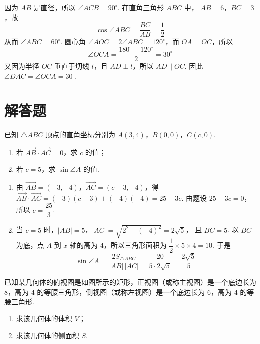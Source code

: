 \begin{solution}
因为 \(AB\) 是直径，所以 \(\angle ACB=90^\circ\). 在直角三角形 \(ABC\) 中，
\(AB=6\)，\(BC=3\)，故
\[
\cos\angle ABC=\frac{BC}{AB}=\frac{1}{2}
\]
从而 \(\angle ABC=60^\circ\). 圆心角
\(\angle AOC=2\angle ABC=120^\circ\)，而 \(OA=OC\)，所以
\[
\angle OCA=\frac{180^\circ-120^\circ}{2}=30^\circ
\]
又因为半径 \(OC\) 垂直于切线 \(l\)，且 \(AD\perp l\)，所以 \(AD\parallel OC\). 因此
\(\angle DAC=\angle OCA=30^\circ\).
\end{solution}

\section{解答题}

\begin{problem}
已知 \(\triangle ABC\) 顶点的直角坐标分别为 \(A(3,4)\)，\(B(0,0)\)，\(C(c,0)\).

\begin{enumerate}
\item 若 \(\overrightarrow{AB} \cdot \overrightarrow{AC} = 0\)，求 \(c\) 的值；
\item 若 \(c = 5\)，求 \(\sin \angle A\) 的值.
\end{enumerate}
\end{problem}

\begin{solution}
\begin{enumerate}
\item 由 \(\overrightarrow{AB}=(-3,-4)\)，\(\overrightarrow{AC}=(c-3,-4)\)，得
\(\overrightarrow{AB}\cdot\overrightarrow{AC}=(-3)(c-3)+(-4)(-4)=25-3c\).
由题设 \(25-3c=0\)，所以 \(c=\dfrac{25}{3}\).
\item 当 \(c=5\) 时，\(|AB|=5\)，\(|AC|=\sqrt{2^{2}+(-4)^{2}}=2\sqrt{5}\)，
且 \(BC=5\). 以 \(BC\) 为底，点 \(A\) 到 \(x\) 轴的高为 \(4\)，所以三角形面积为
\(\dfrac{1}{2}\times5\times4=10\). 于是
\[
\sin\angle A=\frac{2S_{\triangle ABC}}{|AB|\,|AC|}
=\frac{20}{5\cdot2\sqrt{5}}=\frac{2\sqrt{5}}{5}
\]
\end{enumerate}
\end{solution}

\begin{problem}
已知某几何体的俯视图是如图所示的矩形，正视图（或称主视图）是一个底边长为 \(8\)，高为 \(4\) 的等腰三角形，侧视图（或称左视图）是一个底边长为 \(6\)，高为 \(4\) 的等腰三角形.

\begin{enumerate}
\item 求该几何体的体积 \(V\)；
\item 求该几何体的侧面积 \(S\).
\end{enumerate}

\end{problem}

